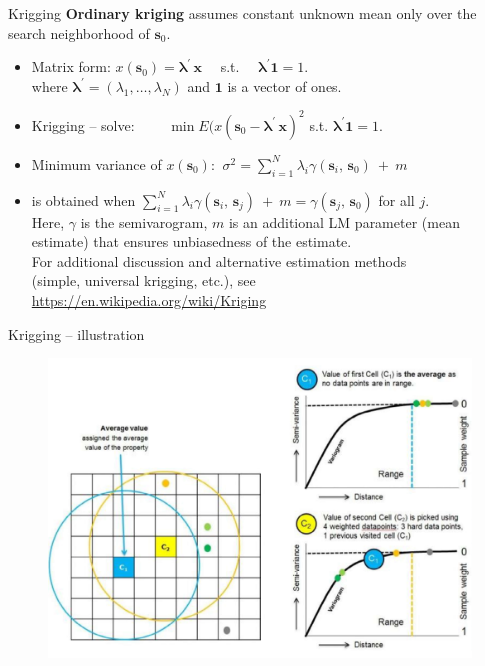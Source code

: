 \documentclass{beamer}
\begin{document}
\begin{frame}{Krigging}
\textbf{Ordinary kriging} assumes constant unknown mean only over the search neighborhood of $\bm{s}_{0}$. \\ \medskip

\begin{itemize}
    \item Matrix form: $x(\bm{s}_0)= \bm{\lambda}^{\prime} \, \bm{x}$ ~~s.t.~~ $\bm{\lambda}^{\prime} \bm{1} = 1$. \\
    where $\bm{\lambda}^{\prime} = (\lambda_1,\dots,\lambda_N)$ and $\bm{1}$ is a vector of ones.
    \medskip
    \item Krigging -- solve:~~~~ $\min E(x(\bm{s}_0 - \bm{\lambda}^{\prime} \, \bm{x})^2$ s.t. $\bm{\lambda}^{\prime} \bm{1} = 1$.\\
    \medskip
    \item  Minimum variance of $x(\bm{s}_0)$: $~\sigma^2= \sum_{i=1}^N \lambda_i \gamma (\bm{s}_i,\,\bm{s}_0)~+~m \,$
    \medskip
    \item is obtained when $\sum_{i=1}^N \lambda_i \gamma (\bm{s}_i,\,\bm{s}_j)~+~m = \gamma (\bm{s}_j,\,\bm{s}_0)$ for all $j$. \\
    \medskip
    Here, $\gamma$ is the semivarogram, $m$ is an additional LM parameter (mean estimate) that ensures unbiasedness of the estimate. \\For additional discussion and alternative estimation methods \\(simple, universal krigging, etc.), see\\
    \url{https://en.wikipedia.org/wiki/Kriging}
\end{itemize}
\end{frame}
\begin{frame}{Krigging -- illustration}
\begin{figure}
	\includegraphics[width=.8\textwidth]{IMG/sp_Krigg.pdf}
\end{figure}
\end{frame}
\end{document}
